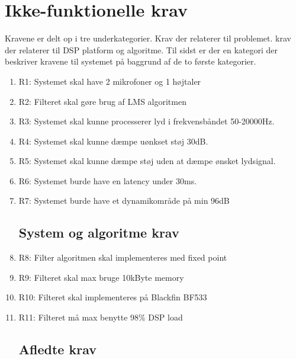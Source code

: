 \section{Ikke-funktionelle krav}
Kravene er delt op i tre underkategorier. Krav der relaterer til problemet. krav der relaterer til DSP platform og algoritme. Til sidst er der en kategori der beskriver kravene til systemet på baggrund af de to første kategorier.
\begin{enumerate}
	
	\subsection{Problemrelateret krav}
	\item R1: Systemet skal have 2 mikrofoner og 1 højtaler
	
	\item R2: Filteret skal gøre brug af LMS algoritmen
	
	\item R3: Systemet skal kunne processerer lyd i frekvensbåndet 50-20000Hz. 
	
	\item R4: Systemet skal kunne dæmpe uønkset støj 30dB.
	
	\item R5: Systemet skal kunne dæmpe støj uden at dæmpe ønsket lydsignal.
	
	\item R6: Systemet burde have en latency under 30ms.
	
	\item R7: Systemet burde have et dynamikområde på min 96dB
	
	\subsection{System og algoritme krav}
	
	\item R8: Filter algoritmen skal implementeres med fixed point 
	
	\item R9: Filteret skal max bruge 10kByte memory
	
	\item R10: Filteret skal implementeres på Blackfin BF533
	
	\item R11: Filteret må max benytte 98\% DSP load

	\subsection{Afledte krav}
	

\end{enumerate}
